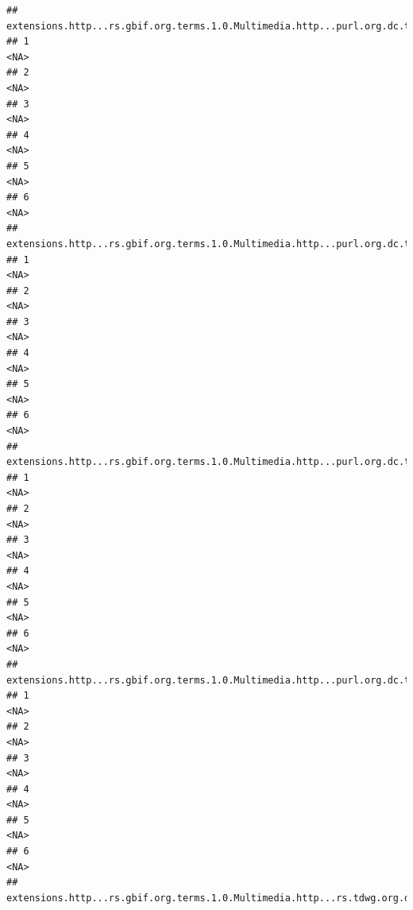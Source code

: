 \documentclass[
]{book}
\begin{document}
\begin{verbatim}
##   extensions.http...rs.gbif.org.terms.1.0.Multimedia.http...purl.org.dc.terms.creator.2
## 1                                                                                  <NA>
## 2                                                                                  <NA>
## 3                                                                                  <NA>
## 4                                                                                  <NA>
## 5                                                                                  <NA>
## 6                                                                                  <NA>
##   extensions.http...rs.gbif.org.terms.1.0.Multimedia.http...purl.org.dc.terms.rightsHolder.3
## 1                                                                                       <NA>
## 2                                                                                       <NA>
## 3                                                                                       <NA>
## 4                                                                                       <NA>
## 5                                                                                       <NA>
## 6                                                                                       <NA>
##   extensions.http...rs.gbif.org.terms.1.0.Multimedia.http...purl.org.dc.terms.identifier.3
## 1                                                                                     <NA>
## 2                                                                                     <NA>
## 3                                                                                     <NA>
## 4                                                                                     <NA>
## 5                                                                                     <NA>
## 6                                                                                     <NA>
##   extensions.http...rs.gbif.org.terms.1.0.Multimedia.http...purl.org.dc.terms.type.3
## 1                                                                               <NA>
## 2                                                                               <NA>
## 3                                                                               <NA>
## 4                                                                               <NA>
## 5                                                                               <NA>
## 6                                                                               <NA>
##   extensions.http...rs.gbif.org.terms.1.0.Multimedia.http...rs.tdwg.org.dwc.terms.catalogNumber.3

\end{verbatim}
\end{document}
